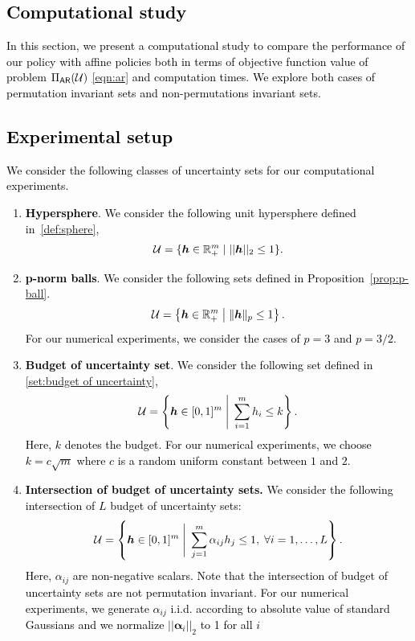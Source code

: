\documentclass[11pt]{article}
\theoremstyle{plain}
\theoremstyle{definition}
\numberwithin{equation}{section}%
\numberwithin{equation}{section}%
\newcommand{\mb}[1]{\ensuremath{\boldsymbol{#1}}}
\newcommand*{\red}{\textcolor{black}}
\begin{document}
\red{
\section{Computational study} \label{sec:sim}
  In this section, we present a computational study to compare the performance of our policy with affine policies both in terms of objective function value of problem $\Pi_{\sf AR}({\cal U})$
\eqref{eqn:ar}
  and computation times. We explore both cases of permutation invariant sets and non-permutations invariant sets.
 \subsection{Experimental setup}
 We consider the following classes of uncertainty sets for our computational experiments.
 \begin{enumerate}
 \item {\bf Hypersphere}. We consider the following unit hypersphere defined in~\eqref{def:sphere},
\begin{equation*}
{\cal U}=\{\mb{h}\in{\mathbb R}^m_+\;|\;||\mb{h}||_2\leq 1\}.
\end{equation*}
 \item {\bf p-norm balls}. We consider the following  sets defined in Proposition~\ref{prop:p-ball}.
 \begin{equation*}
{\cal U}= \left\{ \mb h \in \mathbb R^{m}_+ \;  \big\vert \; \| \mb h\| _p \leq 1 \right\}.
\end{equation*}
For our numerical experiments, we consider the cases of $p=3$ and $p=3/2$.
\item  {\bf Budget of uncertainty set}. We consider the following set defined in \eqref{set:budget of uncertainty},
\begin{equation*}
 {\cal U}= \left\{ \mb h \in [0,1]^{m} \;  \Bigg\vert \; \sum_{i=1}^m h_i \leq k \right\}.
\end{equation*}
Here, $k$ denotes the budget. For our numerical experiments, we choose $k=c  \sqrt{m}$  where $c$ is a random uniform constant between $1$ and $2$.
\item  {\bf Intersection of budget of uncertainty sets.} We consider the following intersection of $L$ budget of uncertainty sets:
\begin{equation} \label{set:inters:budget}
{\cal U}= \left\{ \mb h \in [0,1]^m \; \Bigg\vert \; \sum_{j=1}^m  \alpha_{ij} h_j \leq 1,  \; \forall  i=1,\ldots,L \right\}.
\end{equation}
Here, $\alpha_{ij}$ are non-negative scalars. Note that the intersection of budget of uncertainty sets are not permutation invariant. For our numerical experiments, we generate $\alpha_{ij} $ i.i.d. according to absolute value of standard Gaussians and we normalize $\vert\vert \mb \alpha_i \vert\vert_2$ to 1 for all $i$

\end{enumerate}}
\end{document}
